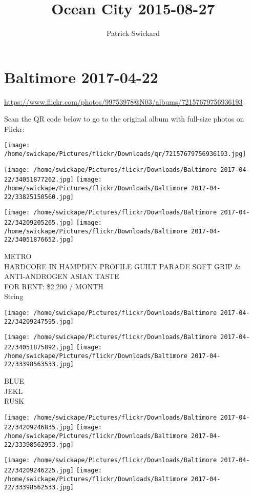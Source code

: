 \documentclass[10pt,letterpaper]{article}
\title{Ocean City 2015-08-27}
\author{Patrick Swickard}
\date{}
\begin{document}
\section*{Baltimore 2017-04-22}

\url{https://www.flickr.com/photos/99753978@N03/albums/72157679756936193}

Scan the QR code below to go to the original album with full-size photos on Flickr:

\texttt{[image: /home/swickape/Pictures/flickr/Downloads/qr/72157679756936193.jpg]}
\pagebreak

\texttt{[image: /home/swickape/Pictures/flickr/Downloads/Baltimore 2017-04-22/34051877262.jpg]}
\texttt{[image: /home/swickape/Pictures/flickr/Downloads/Baltimore 2017-04-22/33825150560.jpg]}

\texttt{[image: /home/swickape/Pictures/flickr/Downloads/Baltimore 2017-04-22/34209205265.jpg]}
\texttt{[image: /home/swickape/Pictures/flickr/Downloads/Baltimore 2017-04-22/34051876652.jpg]}

METRO\\
HARDCORE IN HAMPDEN PROFILE GUILT PARADE SOFT GRIP \& ANTI{-}ANDROGEN ASIAN TASTE\\
FOR RENT: \$2,200 / MONTH\\
String
\pagebreak

\texttt{[image: /home/swickape/Pictures/flickr/Downloads/Baltimore 2017-04-22/34209247595.jpg]}

\vspace{0.25in}
\texttt{[image: /home/swickape/Pictures/flickr/Downloads/Baltimore 2017-04-22/34051875892.jpg]}
\texttt{[image: /home/swickape/Pictures/flickr/Downloads/Baltimore 2017-04-22/33398563533.jpg]}

BLUE\\
JEKL\\
RUSK
\pagebreak

\texttt{[image: /home/swickape/Pictures/flickr/Downloads/Baltimore 2017-04-22/34209246835.jpg]}
\texttt{[image: /home/swickape/Pictures/flickr/Downloads/Baltimore 2017-04-22/33398562953.jpg]}

\texttt{[image: /home/swickape/Pictures/flickr/Downloads/Baltimore 2017-04-22/34209246225.jpg]}
\texttt{[image: /home/swickape/Pictures/flickr/Downloads/Baltimore 2017-04-22/33398562533.jpg]}
\end{document}
